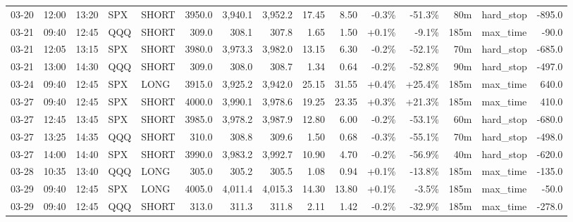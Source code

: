 \documentclass[11pt,a4paper,twoside]{article}
\begin{document}
\begin{landscape}
\begin{center}
\begin{longtable}{>{\color{txtmain}}l l l l l r r r r r r r r >{\color{txtmain}}l r}
03-20 & 12:00 & 13:20 & SPX & SHORT & 3950.0 & 3,940.1 & 3,952.2 & 17.45 & 8.50 & \textcolor{lossred}{-0.3\%} & \textcolor{lossred}{-51.3\%} & 80m & hard\_stop & \textcolor{lossred}{-895.0} \\
03-21 & 09:40 & 12:45 & QQQ & SHORT & 309.0 & 308.1 & 307.8 & 1.65 & 1.50 & \textcolor{wingreen}{+0.1\%} & \textcolor{lossred}{-9.1\%} & 185m & max\_time & \textcolor{lossred}{-90.0} \\
03-21 & 12:05 & 13:15 & SPX & SHORT & 3980.0 & 3,973.3 & 3,982.0 & 13.15 & 6.30 & \textcolor{lossred}{-0.2\%} & \textcolor{lossred}{-52.1\%} & 70m & hard\_stop & \textcolor{lossred}{-685.0} \\
03-21 & 13:00 & 14:30 & QQQ & SHORT & 309.0 & 308.0 & 308.7 & 1.34 & 0.64 & \textcolor{lossred}{-0.2\%} & \textcolor{lossred}{-52.8\%} & 90m & hard\_stop & \textcolor{lossred}{-497.0} \\
03-24 & 09:40 & 12:45 & SPX & LONG & 3915.0 & 3,925.2 & 3,942.0 & 25.15 & 31.55 & \textcolor{wingreen}{+0.4\%} & \textcolor{wingreen}{+25.4\%} & 185m & max\_time & \textcolor{wingreen}{640.0} \\
03-27 & 09:40 & 12:45 & SPX & SHORT & 4000.0 & 3,990.1 & 3,978.6 & 19.25 & 23.35 & \textcolor{wingreen}{+0.3\%} & \textcolor{wingreen}{+21.3\%} & 185m & max\_time & \textcolor{wingreen}{410.0} \\
03-27 & 12:45 & 13:45 & SPX & SHORT & 3985.0 & 3,978.2 & 3,987.9 & 12.80 & 6.00 & \textcolor{lossred}{-0.2\%} & \textcolor{lossred}{-53.1\%} & 60m & hard\_stop & \textcolor{lossred}{-680.0} \\
03-27 & 13:25 & 14:35 & QQQ & SHORT & 310.0 & 308.8 & 309.6 & 1.50 & 0.68 & \textcolor{lossred}{-0.3\%} & \textcolor{lossred}{-55.1\%} & 70m & hard\_stop & \textcolor{lossred}{-498.0} \\
03-27 & 14:00 & 14:40 & SPX & SHORT & 3990.0 & 3,983.2 & 3,992.7 & 10.90 & 4.70 & \textcolor{lossred}{-0.2\%} & \textcolor{lossred}{-56.9\%} & 40m & hard\_stop & \textcolor{lossred}{-620.0} \\
03-28 & 10:35 & 13:40 & QQQ & LONG & 305.0 & 305.2 & 305.5 & 1.08 & 0.94 & \textcolor{wingreen}{+0.1\%} & \textcolor{lossred}{-13.8\%} & 185m & max\_time & \textcolor{lossred}{-135.0} \\
03-29 & 09:40 & 12:45 & SPX & LONG & 4005.0 & 4,011.4 & 4,015.3 & 14.30 & 13.80 & \textcolor{wingreen}{+0.1\%} & \textcolor{lossred}{-3.5\%} & 185m & max\_time & \textcolor{lossred}{-50.0} \\
03-29 & 09:40 & 12:45 & QQQ & SHORT & 313.0 & 311.3 & 311.8 & 2.11 & 1.42 & \textcolor{lossred}{-0.2\%} & \textcolor{lossred}{-32.9\%} & 185m & max\_time & \textcolor{lossred}{-278.0} \\

\end{longtable}
\end{center}
\end{landscape}
\end{document}
